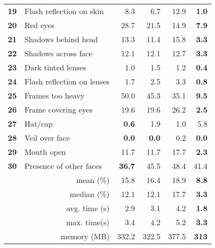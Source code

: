 \begin{table}[tb]
{\begin{tabular}{clrrrr}
\textbf{19} & Flash reflection on skin          & 8.3           & 6.7          & 12.9  & \textbf{1.0}  \\
\textbf{20} & Red eyes                          & 28.7          & 21.5         & 14.9  & \textbf{7.9}  \\
\textbf{21} & Shadows behind head               & 13.3          & 11.4         & 15.8  & \textbf{3.3}  \\
\textbf{22} & Shadows across face               & 12.1          & 12.1         & 12.7  & \textbf{3.3}  \\
\textbf{23} & Dark tinted lenses                & 1.0           & 1.5          & 1.2   & \textbf{0.4}  \\
\textbf{24} & Flash reflection on lenses        & 1.7           & 2.5          & 3.3   & \textbf{0.8}  \\
\textbf{25} & Frames too heavy                  & 50.0          & 45.3         & 35.1  & \textbf{9.5}  \\
\textbf{26} & Frame covering eyes               & 19.6          & 19.6         & 26.2  & \textbf{2.5}  \\
\textbf{27} & Hat/cap                           & \textbf{0.6}  & 1.9          & 1.0   & 5.8           \\
\textbf{28} & Veil over face                    & \textbf{0.0}  & \textbf{0.0} & 0.2   & \textbf{0.0}  \\
\textbf{29} & Mouth open                        & 11.7          & 11.7         & 17.7  & \textbf{2.3}  \\
\textbf{30} & Presence of other faces           & \textbf{36.7} & 45.5         & 48.4  & 41.4          \\ \hline
            & \multicolumn{1}{r}{mean (\%)}      & 15.8          & 16.4         & 18.9  & \textbf{8.8}  \\
            & \multicolumn{1}{r}{median (\%)}    & 12.1          & 12.1         & 17.7  & \textbf{3.3}  \\
            & \multicolumn{1}{r}{avg. time (s)} & 2.9           & 3.1          & 4.2   & \textbf{1.8}  \\
            & \multicolumn{1}{r}{max. time(s)}  & 3.4           & 4.2          & 5.2   & \textbf{3.3}  \\
            & \multicolumn{1}{r}{memory (MB)}   & 332.2         & 322.5        & 377.5 & \textbf{313} 
\end{tabular}%
}
\end{table}